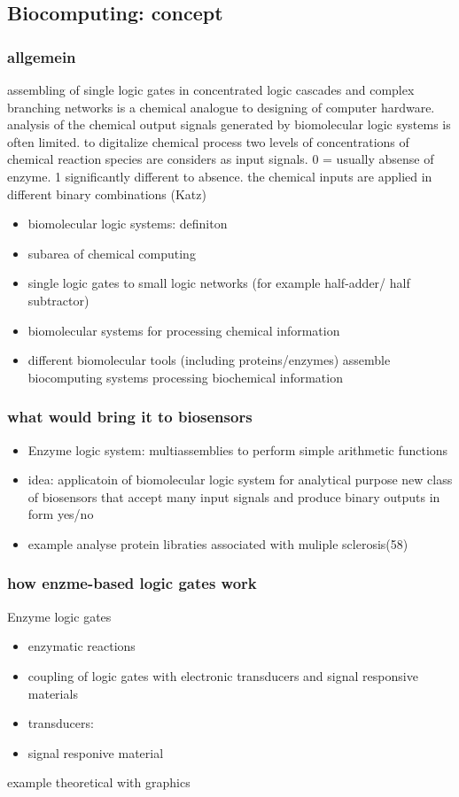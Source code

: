 \documentclass[runningheads]{llncs}
\begin{document}
\subsection{Biocomputing: concept}
	
	\subsubsection{allgemein}
	
	assembling of single logic gates in concentrated logic cascades and complex branching networks is a chemical analogue to designing of computer hardware. analysis of the chemical output signals generated by biomolecular logic systems is often limited.
	to digitalize chemical process two levels of concentrations of chemical reaction species are considers as input signals. 0 = usually absense of enzyme. 1 significantly different to absence. the chemical inputs are applied in different binary combinations (Katz)
		\begin{itemize}
			\item biomolecular logic systems: definiton
			\item subarea of chemical computing 
			\item single logic gates to small logic networks (for example half-adder/ half subtractor)
			\item biomolecular systems for processing chemical information
			\item different biomolecular tools (including proteins/enzymes) assemble biocomputing systems processing biochemical information \\	
		\end{itemize}
	\subsubsection{what would bring it to biosensors}	
	\begin{itemize}	
		\item Enzyme logic system: multiassemblies to perform simple arithmetic functions
		\item idea: applicatoin of biomolecular logic system for analytical purpose new class of biosensors that accept many input signals and produce binary outputs in form yes/no 
		\item example analyse protein libraties associated with muliple sclerosis(58)
	\end{itemize}

	\subsubsection{how enzme-based logic gates work}	
Enzyme logic gates
\begin{itemize}
	\item enzymatic reactions
	\item coupling of logic gates with electronic transducers and signal responsive materials
	\item transducers:
	\item signal responive material
	
\end{itemize}
example theoretical with graphics
\end{document}
